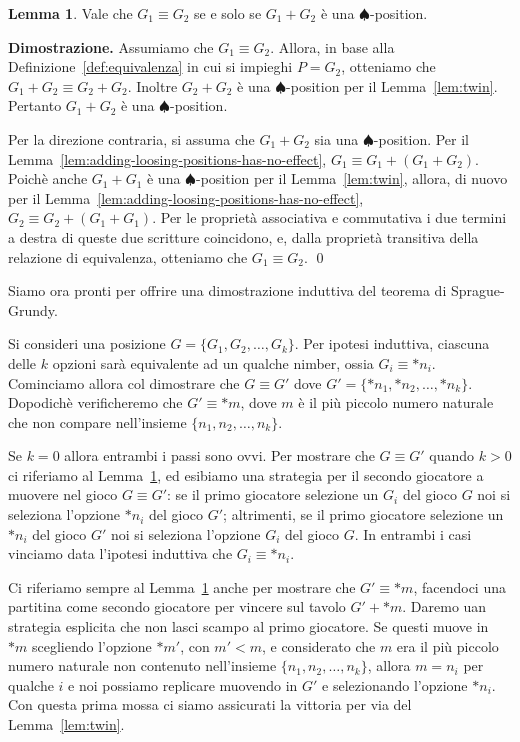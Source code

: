 \documentclass[a4paper, 10pt]{report}
\newenvironment{dimostrazione}{\textbf{Dimostrazione.} }{ \qed}
\theoremstyle{definition} %
\newtheorem{lemma}{Lemma}
\begin{document}
\begin{lemma} \label{lem:compare}
  Vale che $G_1 \equiv G_2$ se e solo se $G_1 + G_2$
  è una $\spadesuit$-position.
\end{lemma}
\begin{dimostrazione}
  Assumiamo che $G_1 \equiv G_2$.
  Allora, in base alla Definizione~\ref{def:equivalenza} in cui si impieghi $P=G_2$,
  otteniamo che $G_1 + G_2 \equiv G_2 + G_2$.
  Inoltre $G_2 + G_2$ è una $\spadesuit$-position per il Lemma~\ref{lem:twin}.
  Pertanto $G_1 + G_2$ è una $\spadesuit$-position.
  
  Per la direzione contraria, si assuma che $G_1 + G_2$ sia una $\spadesuit$-position. Per il Lemma~\ref{lem:adding-loosing-positions-has-no-effect},
  $G_1 \equiv G_1 + (G_1 + G_2)$.
  Poichè anche $G_1+G_1$ è una $\spadesuit$-position
  per il Lemma~\ref{lem:twin}, allora,
  di nuovo per il Lemma~\ref{lem:adding-loosing-positions-has-no-effect},
  $G_2 \equiv G_2 + (G_1 + G_1)$.
  Per le proprietà associativa e commutativa i due termini a destra di queste due scritture coincidono, e, dalla proprietà transitiva
  della relazione di equivalenza, otteniamo che $G_1 \equiv G_2$. 
\end{dimostrazione}

Siamo ora pronti per offrire una dimostrazione induttiva del teorema di Sprague-Grundy. 

Si consideri una posizione $G = \{ G_1, G_2,\ldots , G_k\}$.
Per ipotesi induttiva,
ciascuna delle $k$ opzioni sarà equivalente ad un qualche nimber,
ossia $G_i \equiv *n_i$.
Cominciamo allora col dimostrare che $G\equiv G'$
dove $G'=\{ *n_1, *n_2,\ldots , *n_k\}$.
Dopodichè verificheremo che $G' \equiv *m$,
dove $m$ è il più piccolo numero naturale che non compare
nell'insieme $\{ n_1, n_2,\ldots , n_k\}$.

Se $k=0$ allora entrambi i passi sono ovvi.
Per mostrare che $G\equiv G'$ quando $k>0$
ci riferiamo al Lemma~\ref{lem:compare},
ed esibiamo una strategia per il secondo giocatore a muovere
nel gioco $G\equiv G'$:
se il primo giocatore selezione un $G_i$ del gioco $G$ noi si seleziona
l'opzione $*n_i$ del gioco $G'$; altrimenti,
se il primo giocatore selezione un $*n_i$ del gioco $G'$ noi si seleziona
l'opzione $G_i$ del gioco $G$.
In entrambi i casi vinciamo data l'ipotesi induttiva che $G_i \equiv *n_i$.

Ci riferiamo sempre al Lemma~\ref{lem:compare}
anche per mostrare che $G'\equiv *m$, facendoci una partitina
come secondo giocatore per vincere sul tavolo $G' + *m$.
Daremo uan strategia esplicita che non lasci scampo al primo giocatore.
Se questi muove in $*m$ scegliendo l'opzione $*m'$, con $m' < m$,
e considerato che $m$ era il più piccolo numero naturale non contenuto
nell'insieme $\{ n_1, n_2,\ldots , n_k\}$,
allora $m=n_i$ per qualche $i$ e noi possiamo replicare
muovendo in $G'$ e selezionando l'opzione $*n_i$.
Con questa prima mossa ci siamo assicurati la vittoria per via del Lemma~\ref{lem:twin}. 
\end{document}
